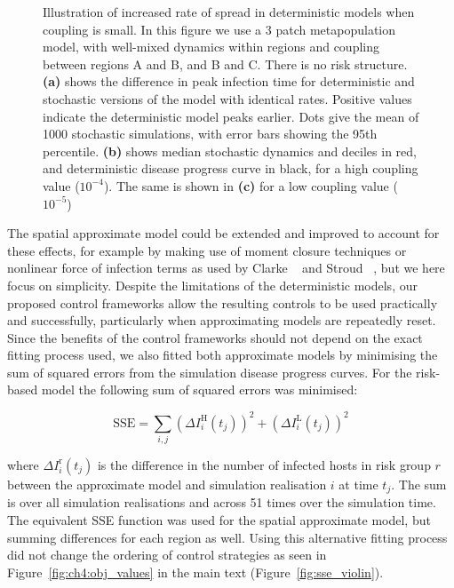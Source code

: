 \begin{figure}
    \begin{center}
        \caption[Time lags in deterministic and stochastic analogues]{Illustration of increased rate of spread in deterministic models when coupling is small. In this figure we use a 3 patch metapopulation model, with well-mixed dynamics within regions and coupling between regions A and B, and B and C. There is no risk structure. \textbf{(a)} shows the difference in peak infection time for deterministic and stochastic versions of the model with identical rates. Positive values indicate the deterministic model peaks earlier. Dots give the mean of 1000 stochastic simulations, with error bars showing the 95th percentile. \textbf{(b)} shows median stochastic dynamics and deciles in red, and deterministic disease progress curve in black, for a high coupling value ($10^{-4}$). The same is shown in \textbf{(c)} for a low coupling value ($10^{-5}$)}
        \label{fig:time_lag}
    \end{center}
\end{figure}

The spatial approximate model could be extended and improved to account for these effects, for example by making use of moment closure techniques \citep{keeling_effects_1999} or nonlinear force of infection terms \citep{roy_representing_2006} as used by Clarke \etal\ \citep{clarke_approximating_2013} and Stroud \etal\ \citep{stroud_semi-empirical_2006}, but we here focus on simplicity. Despite the limitations of the deterministic models, our proposed control frameworks allow the resulting controls to be used practically and successfully, particularly when approximating models are repeatedly reset. Since the benefits of the control frameworks should not depend on the exact fitting process used, we also fitted both approximate models by minimising the sum of squared errors from the simulation disease progress curves. For the risk-based model the following sum of squared errors was minimised:
\begin{linenomath*}
\begin{equation}
    \mathrm{SSE} = \sum_{i,j}\left(\Delta{}I_i^\mathrm{H}(t_j)\right)^2 + \left(\Delta{}I_i^\mathrm{L}(t_j)\right)^2
\end{equation}
\end{linenomath*}
where $\Delta{}I_i^\mathrm{r}(t_j)$ is the difference in the number of infected hosts in risk group $r$ between the approximate model and simulation realisation $i$ at time $t_j$. The sum is over all simulation realisations and across 51 times over the simulation time. The equivalent SSE function was used for the spatial approximate model, but summing differences for each region as well. Using this alternative fitting process did not change the ordering of control strategies as seen in Figure~\ref{fig:ch4:obj_values} in the main text (Figure~\ref{fig:sse_violin}).

